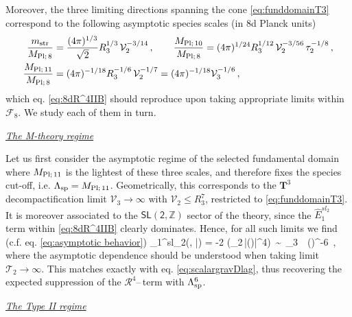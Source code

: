 %
Moreover, the three limiting directions spanning the cone \eqref{eq:funddomainT3} correspond to the following asymptotic species scales (in 8d Planck units) 
%
\begin{equation} \label{eq:QGcutoffs8d}
	\begin{split} 
		\frac{m_{\text{str}}}{M_{\rm Pl;\, 8}} &= \frac{(4\pi)^{1/3}}{\sqrt{2}} R_3^{1/3}\, \mathcal{V}_2^{-3/14} \, , \qquad \frac{M_{\rm Pl;\, 10}}{M_{\rm Pl;\, 8}} = (4\pi)^{1/24} R_3^{1/12}\, \mathcal{V}_2^{-3/56}\, \tau_2^{-1/8} \, ,\\
		\frac{M_{\rm Pl;\, 11}}{M_{\rm Pl;\, 8}} &= (4\pi)^{-1/18} R_3^{-1/6}\, \mathcal{V}_2^{-1/7} = (4\pi)^{-1/18} \mathcal{V}_3^{-1/6}\, ,
	\end{split}
\end{equation}
%
which eq. \eqref{eq:8dR^4IIB} should reproduce upon taking appropriate limits within $\mathscr{F}_8$. We study each of them in turn. %
\newline

\underline{\textit{The M-theory regime}}
\newline

Let us first consider the asymptotic regime of the selected fundamental domain where $M_{\rm Pl;\, 11}$ is the lightest of these three scales, and therefore fixes the species cut-off, i.e. $\Lambda_{\text{sp}}=M_{\rm Pl;\, 11}$. Geometrically, this corresponds to the $\mathbf{T}^3$ decompactification limit $\mathcal{V}_3 \to \infty$ with $\mathcal{V}_2 \leq R_3^7$, restricted to \eqref{eq:funddomainT3}. It is moreover associated to the $\mathsf{SL(2,\mathbb{Z})}$ sector of the theory, since the $\hat{E}_{1}^{sl_2}$ term within \eqref{eq:8dR^4IIB} clearly dominates. Hence, for all such limits we find (c.f. eq. \eqref{eq:asymptotic behavior})
%
_{1}^{sl_2}(, \bar{}) = -2\pi{} \left(_2\,|\eta()|^4\right)\, \sim\,  _3\, \propto\, \left(\right)^{-6}\, ,
\eeq
%
where the asymptotic dependence should be understood when taking limit $\mathcal{T}_2\to \infty$. This matches exactly with eq. \eqref{eq:scalargravDlag}, thus recovering the expected suppression of the $\mathcal{R}^4$--\,term with $\Lambda_{\text{sp}}^6$.
\newline

\underline{\textit{The Type II regime}}
\newline
 
